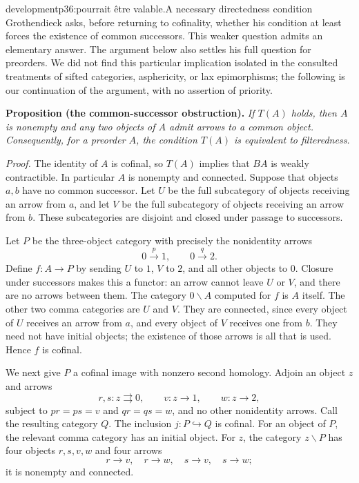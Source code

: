 \begin{dcomment}{development}{p36:pourrait être valable.}{A necessary directedness condition}
Grothendieck asks, before returning to cofinality, whether his condition at least forces the existence of common successors. This weaker question admits an elementary answer. The argument below also settles his full question for preorders. We did not find this particular implication isolated in the consulted treatments of sifted categories, asphericity, or lax epimorphisms; the following is our continuation of the argument, with no assertion of priority.

\textbf{Proposition (the common-successor obstruction).}\ours
\textit{If $T(A)$ holds, then $A$ is nonempty and any two objects of $A$ admit arrows to a common object. Consequently, for a preorder $A$, the condition $T(A)$ is equivalent to filteredness.}

\textit{Proof.}
The identity of $A$ is cofinal, so $T(A)$ implies that $B A$ is weakly contractible. In particular $A$ is nonempty and connected. Suppose that objects $a,b$ have no common successor. Let $U$ be the full subcategory of objects receiving an arrow from $a$, and let $V$ be the full subcategory of objects receiving an arrow from $b$. These subcategories are disjoint and closed under passage to successors.

Let $P$ be the three-object category with precisely the nonidentity arrows
\[
 0\xrightarrow{p}1,\qquad 0\xrightarrow{q}2.
\]
Define $f:A\longrightarrow P$ by sending $U$ to $1$, $V$ to $2$, and all other objects to $0$. Closure under successors makes this a functor: an arrow cannot leave $U$ or $V$, and there are no arrows between them. The category $0\backslash A$ computed for $f$ is $A$ itself. The other two comma categories are $U$ and $V$. They are connected, since every object of $U$ receives an arrow from $a$, and every object of $V$ receives one from $b$. They need not have initial objects; the existence of those arrows is all that is used. Hence $f$ is cofinal.

We next give $P$ a cofinal image with nonzero second homology. Adjoin an object $z$ and arrows
\[
 r,s:z\rightrightarrows0,
 \qquad v:z\longrightarrow1,
 \qquad w:z\longrightarrow2,
\]
subject to $pr=ps=v$ and $qr=qs=w$, and no other nonidentity arrows. Call the resulting category $Q$. The inclusion $j:P\hookrightarrow Q$ is cofinal. For an object of $P$, the relevant comma category has an initial object. For $z$, the category $z\backslash P$ has four objects $r,s,v,w$ and four arrows
\[
 r\longrightarrow v,\quad r\longrightarrow w,
 \quad s\longrightarrow v,\quad s\longrightarrow w;
\]
it is nonempty and connected.


\end{dcomment}
